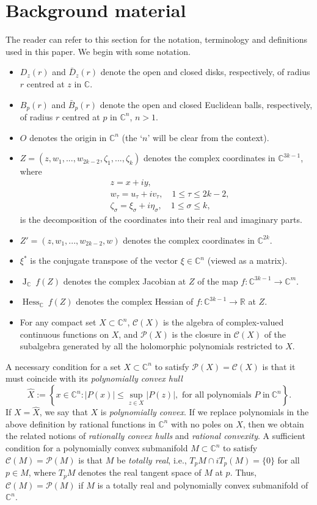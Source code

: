 \documentclass[10pt]{amsart}
\numberwithin{equation}{section}
\theoremstyle{definition}
\theoremstyle{definition}
\theoremstyle{plain}
\newcommand{\bes} {\begin{equation*}}
\newcommand{\ees} {\end{equation*}}
\newcommand{\Chess}{\operatorname{Hess}_{ \C}\!\:}
\newcommand{\JacC}{\operatorname{J}_\C\!\:}
\newcommand{\cont}{\mathcal{C}}
\newcommand{\Cn}{\mathbb{C}^n}
\newcommand{\C} {\mathbb{C}}
\newcommand{\rl}{\mathbb{R}}
\begin{document}
\section{Background material}\label{sec_backmat}
The reader can refer to this section for the notation, terminology and definitions used in this paper. We begin with some notation. 

\begin{itemize} 
%
\item $D_z(r)$ and $\bar D_z(r)$ denote the open and closed disks, respectively, of radius $r$ centred at $z$ in $\C$. 
%
\item $B_p(r)$ and $\bar B_p(r)$ denote the open and closed Euclidean balls, respectively, of radius $r$ centred at $p$ in $\Cn$, $n>1$. 
%
\item $O$ denotes the origin in $\C^n$ (the `$n$' will be clear from the context).  
%
\item $Z=(z,w_1,...,w_{2k-2},\zeta_1,...,\zeta_k)$ denotes the complex coordinates in $\C^{3k-1}$, where  
		\begin{align*}
		&z=x+iy,\\
		&w_\tau=u_\tau+iv_\tau,\quad 1\leq \tau\leq 2k-2,\\
		&\zeta_\sigma=\xi_\sigma+i\eta_\sigma,\quad  1\leq \sigma\leq k ,
	\end{align*}
is the decomposition of the coordinates into their real and imaginary parts. 
%
\item $Z'=(z,w_1,...,w_{2k-2},w)$ denotes the complex coordinates in $	\C^{2k}$. 
\item $\xi^*$ is the conjugate transpose of the vector $\xi\in\Cn$ (viewed as a  matrix).
\item $\JacC f(Z)$ denotes the complex Jacobian at $Z$ of the map $f:\C^{3k-1}\rightarrow\C^m$.
\item $\Chess f(Z)$ denotes the complex Hessian of $f:\C^{3k-1}\rightarrow\rl$ at $Z$.
\item For any compact set $X\subset\Cn$, $\cont(X)$ is the algebra of complex-valued continuous functions on $X$, and $\mathcal{P}(X)$ is the closure in $\cont(X)$ of the subalgebra generated by all the holomorphic polynomials restricted to $X$. 
\end{itemize} 

A necessary condition for a set $X\subset\Cn$ to satisfy $\mathcal{P}(X)=\cont(X)$ is that it must  coincide with its {\em polynomially convex hull}
	\bes
		\widehat X:=\left\{x\in\Cn:|P(x)|\leq \sup_{z\in X}|P(z)|, \text{ for all polynomials $P$ in}\ \Cn\right\}.
	\ees
If $X=\widehat X$, we say that $X$ is {\it polynomially convex}. If we replace polynomials in the above definition by rational functions in $\Cn$ with no poles on $X$, then we obtain the related notions of {\em rationally convex hulls} and {\em rational convexity}. A sufficient condition for a polynomially convex submanifold $M\subset\Cn$ to satisfy $\cont(M)=\mathcal P(M)$ is that $M$ be {\it totally real}, i.e., $T_pM\cap iT_p(M)=\{0\}$ for all $p\in M$, where $T_pM$ denotes the real tangent space of $M$ at $p$. Thus, $\cont(M)=\mathcal{P}(M)$ if $M$ is a totally real and polynomially convex submanifold of $\Cn$. 
\end{document}
